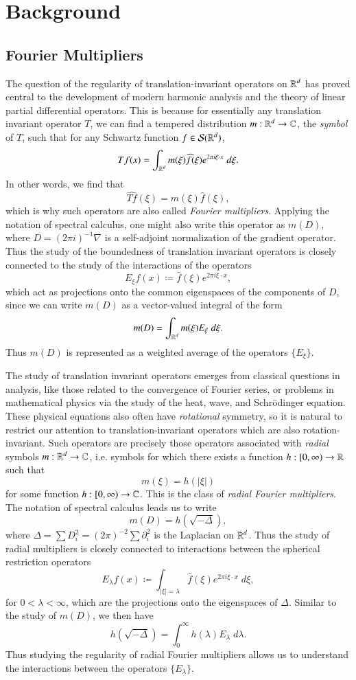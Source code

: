 \part{Background}

\chapter{Fourier Multipliers}

The question of the regularity of translation-invariant operators on $\operatorname{\mathbb{R}}^d$ has proved central to the development of modern harmonic analysis and the theory of linear partial differential operators. This is because for essentially any translation invariant operator $T$, we can find a tempered distribution $m: \operatorname{\mathbb{R}}^d \to \operatorname{\mathbb{C}}$, the \emph{symbol} of $T$, such that for any Schwartz function $f \in \mathcal{S}(\operatorname{\mathbb{R}}^d)$,
%
\[ Tf(x) = \int_{\operatorname{\mathbb{R}}^d} m(\xi) \widehat{f}(\xi) e^{2 \pi i \xi \cdot x}\; d\xi. \]
%
In other words, we find that
%
\[ \widehat{Tf}(\xi) = m(\xi) \widehat{f}(\xi), \]
%
which is why such operators are also called \emph{Fourier multipliers}. Applying the notation of spectral calculus, one might also write this operator as $m(D)$, where $D = (2 \pi i)^{-1} \nabla$ is a self-adjoint normalization of the gradient operator. Thus the study of the boundedness of translation invariant operators is closely connected to the study of the interactions of the operators
%
\[ E_\xi f(x) \coloneqq \widehat{f}(\xi) e^{2 \pi i \xi \cdot x}, \]
%
which act as projections onto the common eigenspaces of the components of $D$, since we can write $m(D)$ as a vector-valued integral of the form
%
\[ m(D) = \int_{\operatorname{\mathbb{R}}^d} m(\xi) E_\xi\; d\xi. \]
%
Thus $m(D)$ is represented as a weighted average of the operators $\{ E_\xi \}$.

The study of translation invariant operators emerges from classical questions in analysis, like those related to the convergence of Fourier series, or problems in mathematical physics via the study of the heat, wave, and Schr\"{o}dinger equation. These physical equations also often have \emph{rotational} symmetry, so it is natural to restrict our attention to translation-invariant operators which are also rotation-invariant. Such operators are precisely those operators associated with \emph{radial} symbols $m: \operatorname{\mathbb{R}}^d \to \operatorname{\mathbb{C}}$, i.e. symbols for which there exists a function $h: [0,\infty) \to \operatorname{\mathbb{R}}$ such that
%
\[ m(\xi) = h( |\xi|) \]
%
for some function $h: [0,\infty) \to \operatorname{\mathbb{C}}$. This is the class of \emph{radial Fourier multipliers}. The notation of spectral calculus leads us to write
%
\[ m(D) = h \left( \sqrt{-\Delta} \right), \]
%
where $\Delta = \sum D_i^2 = (2\pi)^{-2} \sum \partial_i^2$ is the Laplacian on $\operatorname{\mathbb{R}}^d$. Thus the study of radial multipliers is closely connected to interactions between the spherical restriction operators
%
\[ E_\lambda f(x) \coloneqq \int_{|\xi| = \lambda} \widehat{f}(\xi) e^{2 \pi i \xi \cdot x}\; d\xi, \]
%
for $0 < \lambda < \infty$, which are the projections onto the eigenspaces of $\Delta$. Similar to the study of $m(D)$, we then have
%
\[ h \left( \sqrt{-\Delta} \right) = \int_0^\infty h(\lambda) E_\lambda\; d\lambda. \]
%
Thus studying the regularity of radial Fourier multipliers allows us to understand the interactions between the operators $\{ E_\lambda \}$.

